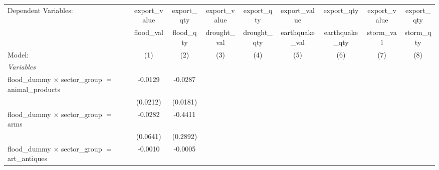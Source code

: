 
\begingroup
\centering
\begin{tabular}{lcccccccc}
   \tabularnewline \midrule \midrule
   Dependent Variables:                                                           & export\_value         & export\_qty           & export\_value         & export\_qty           & export\_value         & export\_qty           & export\_value         & export\_qty\\   
                                                                                  & flood\_val            & flood\_qty            & drought\_val          & drought\_qty          & earthquake\_val       & earthquake\_qty       & storm\_val            & storm\_qty \\    
   Model:                                                                         & (1)                   & (2)                   & (3)                   & (4)                   & (5)                   & (6)                   & (7)                   & (8)\\  
   \midrule
   \emph{Variables}\\
   flood\_dummy $\times$ sector\_group $=$ animal\_products                       & -0.0129               & -0.0287               &                       &                       &                       &                       &                       &   \\   
                                                                                  & (0.0212)              & (0.0181)              &                       &                       &                       &                       &                       &   \\   
   flood\_dummy $\times$ sector\_group $=$ arms                                   & -0.0282               & -0.4411               &                       &                       &                       &                       &                       &   \\   
                                                                                  & (0.0641)              & (0.2892)              &                       &                       &                       &                       &                       &   \\   
   flood\_dummy $\times$ sector\_group $=$ art\_antiques                          & -0.0010               & -0.0005               &                       &                       &                       &                       &                       &   \\   

\end{tabular}
